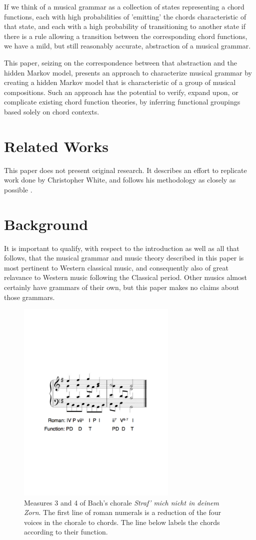 \documentclass[letterpaper]{article}
\begin{document}
If we think of a musical grammar as a collection of states representing a chord functions, each with high probabilities of 'emitting' the chords characteristic of that state, and each with a high probability of transitioning to another state if there is a rule allowing a transition between the corresponding chord functions, we have a mild, but still reasonably accurate, abstraction of a musical grammar.

This paper, seizing on the correspondence between that abstraction and the hidden Markov model, presents an approach to characterize musical grammar by creating a hidden Markov model that is characteristic of a group of musical compositions. Such an approach has the potential to verify, expand upon, or complicate existing chord function theories, by inferring functional groupings based solely on chord contexts.

\section{Related Works}
This paper does not present original research. It describes an effort to replicate work done by Christopher White, and follows his methodology as closely as possible \cite{white, white2}.

\section{Background}
It is important to qualify, with respect to the introduction as well as all that follows, that the musical grammar and music theory described in this paper is most pertinent to Western classical music, and consequently also of great relavance to Western music following the Classical period. Other musics almost certainly have grammars of their own, but this paper makes no claims about those grammars.

\begin{figure}
\vspace{-100pt}
\includegraphics[width=3in]{tpd.pdf}
\vspace{-100pt}
\caption{Measures 3 and 4 of Bach's chorale \emph{Straf' mich nicht in deinem Zorn}. The first line of roman numerals is a reduction of the four voices in the chorale to chords. The line below labels the chords according to their function.}
\end{figure}
\end{document}

